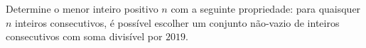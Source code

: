Determine o menor inteiro positivo $n$ com a seguinte propriedade:
para quaisquer $n$ inteiros consecutivos, é possível escolher um conjunto não-vazio de inteiros consecutivos com soma divisível por $2019$.
